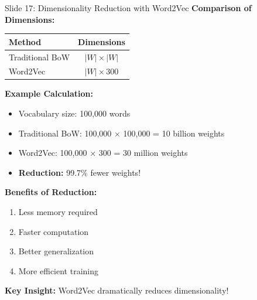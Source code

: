 \documentclass[8pt]{beamer}
\begin{document}
	\begin{frame}{Slide 17: Dimensionality Reduction with Word2Vec}
		\fontsize{6.5}{7.5}\selectfont
		\textbf{Comparison of Dimensions:}
		
		\begin{tabular}{|l|c|}
			\hline
			\textbf{Method} & \textbf{Dimensions} \\
			\hline
			Traditional BoW & $|W| \times |W|$ \\
			Word2Vec & $|W| \times 300$ \\
			\hline
		\end{tabular}
		
		\vspace{0.1cm}
		\textbf{Example Calculation:}
		\begin{itemize}
			\item Vocabulary size: 100,000 words
			\item Traditional BoW: 100,000 $\times$ 100,000 = 10 billion weights
			\item Word2Vec: 100,000 $\times$ 300 = 30 million weights
			\item \textbf{Reduction:} 99.7\% fewer weights!
		\end{itemize}
		
		\vspace{0.1cm}
		\textbf{Benefits of Reduction:}
		\begin{enumerate}
			\item Less memory required
			\item Faster computation
			\item Better generalization
			\item More efficient training
		\end{enumerate}
		
		\textcolor{myblue}{\textbf{Key Insight:}} Word2Vec dramatically reduces dimensionality!
	\end{frame}
	
\end{document}
